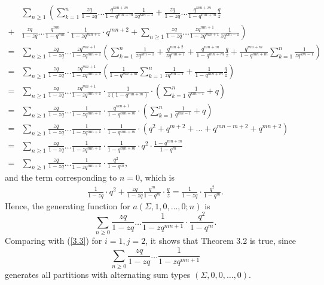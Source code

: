 \documentclass[draft]{amsart}
\numberwithin{equation}{section}
\theoremstyle{plain}
\theoremstyle{remark}
\begin{document}
\begin{align*}\nonumber
&\sum_{n\geq1}\left(\sum_{k=1}^{n}\frac{zq}{1-zq}\dots\frac{q^{mn+m}}{1-q^{mn+m}}\frac{1}{zq^{km-1}}+\frac{zq}{1-zq}\dots\frac{q^{mn+m}}{1-q^{mn+m}}\frac{q}{z}\right.\\
+&\frac{zq}{1-zq}\dots\frac{q^{mn}}{1-q^{mn}}\cdot\frac{1}{1-zq^{mn+1}}\cdot q^{mn+2}
+\sum_{n\geq1}^{}\frac{zq}{1-zq}\dots\frac{zq^{mn+1}}{1-zq^{mn+1}}\left.\frac{1}{zq^{km-1}}\right)\\
=&\sum_{n\geq1}^{}\frac{zq}{1-zq}\dots\frac{zq^{mn+1}}{1-zq^{mn+1}}\left( \sum_{k=1}^{n}\frac{1}{zq^{km-1}}+\frac{q^{mn+2}}{zq^{mn+1}} +\frac{q^{mn+m}}{1-q^{mn+m}}\frac{q}{z}  +\frac{q^{mn+m}}{1-q^{mn+m}}\sum_{k=1}^{n}\frac{1}{zq^{km-1}}\right)\\
=&\sum_{n\geq1}^{}\frac{zq}{1-zq}\dots\frac{zq^{mn+1}}{1-zq^{mn+1}}\left( \frac{1}{1-q^{mn+m}}\sum_{k=1} ^{n} \frac{1}{zq^{km-1}} +\frac{1}{1-q^{mn+m}} \frac{q}{z} \right)\\
=&\sum_{n\geq1}^{}\frac{zq}{1-zq}\dots\frac{zq^{mn+1}}{1-zq^{mn+1}}\cdot \frac{1}{z(1-q^{mn+m})}\cdot\left(   \sum_{k=1}^{n} \frac{1}{q^{km-1}} +q \right)\\
=&\sum_{n\geq1}^{}\frac{zq}{1-zq}\dots\frac{1}{1-zq^{mn+1}}\cdot\frac{q^{mn+1}}{1-q^{mn+m}}\cdot\left(      \sum_{k=1}^{n} \frac{1}{q^{km-1}} +q  \right)\\
=&\sum_{n\geq1}^{}\frac{zq}{1-zq}\dots\frac{1}{1-zq^{mn+1}}\cdot\frac{1}{1-q^{mn+m}}\cdot\left( q^{2} +q^{m+2}+\dots+q^{mn-m+2}+q^{mn+2} \right)\\
=&\sum_{n\geq1}^{}\frac{zq}{1-zq}\dots\frac{1}{1-zq^{mn+1}}\cdot\frac{1}{1-q^{mn+m}}\cdot q^{2}\cdot \frac{1-q^{mn+m}}{1-q^{m}} \\
=&\sum_{n\geq1}^{}\frac{zq}{1-zq}\dots\frac{1}{1-zq^{mn+1}}\cdot \frac{q^{2}}{1-q^{m}},
\end{align*}
and the term corresponding to $n=0$, which is
\begin{align*}
\frac{1}{1-zq}\cdot q^{2}+\frac{zq}{1-zq}\frac{q^{m}}{1-q^{m}}\cdot \frac{q}{z}
=\frac{1}{1-zq}\cdot \frac{q^{2}}{1-q^{m}}.
\end{align*}
Hence, the generating function for $a(\Sigma, 1, 0,\dots,0;    n)$ is
$$
\sum_{n\geq0}^{}\frac{zq}{1-zq}\dots\frac{1}{1-zq^{mn+1}}\cdot \frac{q^{2}}{1-q^{m}}.$$
Comparing with (\ref{3.3}) for $i=1, j=2$, it shows that Theorem 3.2 is true,  since
$$
\sum_{n\geq0}^{}\frac{zq}{1-zq}\dots\frac{1}{1-zq^{mn+1}}
$$
generates all partitions with alternating sum types $(\Sigma, 0, 0,\dots,0)$. 
\end{document}

